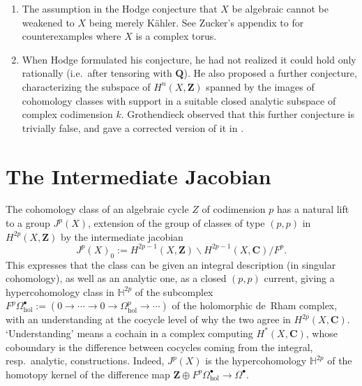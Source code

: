 \documentclass[11pt,a4paper]{article}
\theoremstyle{plain}
\theoremstyle{definition}
\DeclareMathOperator{\cl}{cl}
\begin{document}
\begin{enumerate}[label=(\roman*)]
No counterexample is known to the statement that integral $(p,p)$ classes killed by all $d_{r}$ are integral linear combinations of classes $\cl(Z)$. One has no idea of which classes should be effective, that is, of the form $\cl(Z)$, rather than a difference of such.

On a Stein manifold $X$, any topological complex vector bundle can be given a holomorphic structure and, at least for $X$ of the homotopy type of a finite CW complex, it follows that any class in $H^{2p}(X,\mathbf{Z})$ in the kernel of all $d_{r}$ is a $\mathbf{Z}$-linear combination of classes of analytic cycles.

\item The assumption in the Hodge conjecture that $X$ be algebraic cannot be weakened to $X$ being merely K\"ahler. See Zucker's appendix to \cite{zucker1977} for counterexamples where $X$ is a complex torus.

\item When Hodge formulated his conjecture, he had not realized it could hold only rationally (i.e.~after tensoring with $\mathbf{Q}$). He also proposed a further conjecture, characterizing the subspace of $H^{n}(X,\mathbf{Z})$ spanned by the images of cohomology classes with support in a suitable closed analytic subspace of complex codimension $k$. Grothendieck observed that this further conjecture is trivially false, and gave a corrected version of it in \cite{grothendieck1969}.
\end{enumerate}

\section{The Intermediate Jacobian}

The cohomology class of an algebraic cycle $Z$ of codimension $p$ has a natural lift to a group $J^{p}(X)$, extension of the group of classes of type $(p,p)$ in $H^{2p}(X,\mathbf{Z})$ by the intermediate jacobian
\begin{equation*}
J^{p}(X)_{0} := H^{2p-1}(X,\mathbf{Z}) \backslash H^{2p-1}(X,\mathbf{C}) / F^{p}.
\end{equation*}
This expresses that the class can be given an integral description (in singular cohomology), as well as an analytic one, as a closed $(p,p)$ current, giving a hypercohomology class in $\mathbb{H}^{2p}$ of the subcomplex $F^{p}\Omega_{\text{hol}}^{\bullet} := (0 \to \cdots \to 0 \to \Omega_{\text{hol}}^{p} \to \cdots)$ of the holomorphic de~Rham complex, with an understanding at the cocycle level of why the two agree in $H^{2p}(X,\mathbf{C})$. `Understanding' means a cochain in a complex computing $H^{*}(X,\mathbf{C})$, whose coboundary is the difference between cocycles coming from the integral, resp.~analytic, constructions. Indeed, $J^{p}(X)$ is the hypercohomology $\mathbb{H}^{2p}$ of the homotopy kernel of the difference map $\mathbf{Z} \oplus F^{p}\Omega_{\text{hol}}^{\bullet} \to \Omega^{\bullet}$.
\end{document}
